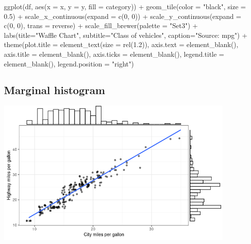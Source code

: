 \documentclass[
]{book}
\newenvironment{Shaded}{\begin{snugshade}}{\end{snugshade}}
\newcommand{\AttributeTok}[1]{\textcolor[rgb]{0.77,0.63,0.00}{#1}}
\newcommand{\DecValTok}[1]{\textcolor[rgb]{0.00,0.00,0.81}{#1}}
\newcommand{\FloatTok}[1]{\textcolor[rgb]{0.00,0.00,0.81}{#1}}
\newcommand{\FunctionTok}[1]{\textcolor[rgb]{0.00,0.00,0.00}{#1}}
\newcommand{\NormalTok}[1]{#1}
\newcommand{\SpecialCharTok}[1]{\textcolor[rgb]{0.00,0.00,0.00}{#1}}
\newcommand{\StringTok}[1]{\textcolor[rgb]{0.31,0.60,0.02}{#1}}
\begin{document}
\begin{Shaded}
\begin{Highlighting}[]
\FunctionTok{ggplot}\NormalTok{(df, }\FunctionTok{aes}\NormalTok{(}\AttributeTok{x =}\NormalTok{ x, }\AttributeTok{y =}\NormalTok{ y, }\AttributeTok{fill =}\NormalTok{ category)) }\SpecialCharTok{+} 
        \FunctionTok{geom\_tile}\NormalTok{(}\AttributeTok{color =} \StringTok{"black"}\NormalTok{, }\AttributeTok{size =} \FloatTok{0.5}\NormalTok{) }\SpecialCharTok{+}
        \FunctionTok{scale\_x\_continuous}\NormalTok{(}\AttributeTok{expand =} \FunctionTok{c}\NormalTok{(}\DecValTok{0}\NormalTok{, }\DecValTok{0}\NormalTok{)) }\SpecialCharTok{+}
        \FunctionTok{scale\_y\_continuous}\NormalTok{(}\AttributeTok{expand =} \FunctionTok{c}\NormalTok{(}\DecValTok{0}\NormalTok{, }\DecValTok{0}\NormalTok{), }\AttributeTok{trans =} \StringTok{\textquotesingle{}reverse\textquotesingle{}}\NormalTok{) }\SpecialCharTok{+}
        \FunctionTok{scale\_fill\_brewer}\NormalTok{(}\AttributeTok{palette =} \StringTok{"Set3"}\NormalTok{) }\SpecialCharTok{+}
        \FunctionTok{labs}\NormalTok{(}\AttributeTok{title=}\StringTok{"Waffle Chart"}\NormalTok{, }\AttributeTok{subtitle=}\StringTok{"\textquotesingle{}Class\textquotesingle{} of vehicles"}\NormalTok{,}
             \AttributeTok{caption=}\StringTok{"Source: mpg"}\NormalTok{) }\SpecialCharTok{+} 
        \FunctionTok{theme}\NormalTok{(}\AttributeTok{plot.title =} \FunctionTok{element\_text}\NormalTok{(}\AttributeTok{size =} \FunctionTok{rel}\NormalTok{(}\FloatTok{1.2}\NormalTok{)),}
              \AttributeTok{axis.text =} \FunctionTok{element\_blank}\NormalTok{(),}
              \AttributeTok{axis.title =} \FunctionTok{element\_blank}\NormalTok{(),}
              \AttributeTok{axis.ticks =} \FunctionTok{element\_blank}\NormalTok{(),}
              \AttributeTok{legend.title =} \FunctionTok{element\_blank}\NormalTok{(),}
              \AttributeTok{legend.position =} \StringTok{"right"}\NormalTok{)}
\end{Highlighting}
\end{Shaded}

\hypertarget{marginal-histogram}{%
\subsection{Marginal histogram}\label{marginal-histogram}}

\includegraphics[width=4.6875in,height=\textheight]{images/10/000046.png}
\end{document}
